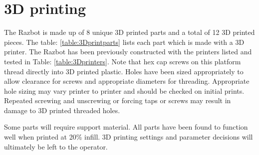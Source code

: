\documentclass[12pt,titlepage,oneside]{memoir}
\begin{document}
\section{3D printing}

The Razbot is made up of 8 unique 3D printed parts and a total of 12 3D printed pieces. The table: \ref{table:3Dprintparts} lists each part which is made with a 3D printer. The Razbot has been previously constructed with the printers listed and tested in Table: \ref{table:3Dprinters}. Note that hex cap screws on this platform thread directly into 3D printed plastic. Holes have been sized appropriately to allow clearance for screws and appropriate diameters for threading. Appropriate hole sizing may vary printer to printer and should be checked on initial prints. Repeated screwing and unscrewing or forcing taps or screws may result in damage to 3D printed threaded holes.  

Some parts will require support material. All parts have been found to function well when printed at 20\% infill. 3D printing settings and parameter decisions will ultimately be left to the operator. 
\end{document}
